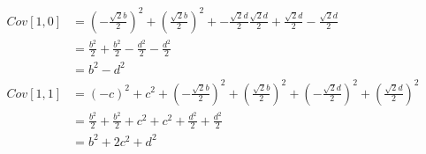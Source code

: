 \begin{align*}
    Cov[1,0] & = \left(- \frac{\sqrt{2} b}{2}\right)^{2} + \left(\frac{\sqrt{2} b}{2}\right)^{2} + - \frac{\sqrt{2} d}{2} \frac{\sqrt{2} d}{2} + \frac{\sqrt{2} d}{2} - \frac{\sqrt{2} d}{2}                      \\
             & = \frac{b^{2}}{2} + \frac{b^{2}}{2} - \frac{d^{2}}{2} - \frac{d^{2}}{2}                                                                                                                            \\
             & = b^{2} - d^{2}                                                                                                                                                                                    \\
    Cov[1,1] & = \left(- c\right)^{2} + c^{2} + \left(- \frac{\sqrt{2} b}{2}\right)^{2} + \left(\frac{\sqrt{2} b}{2}\right)^{2} + \left(- \frac{\sqrt{2} d}{2}\right)^{2} + \left(\frac{\sqrt{2} d}{2}\right)^{2} \\
             & = \frac{b^{2}}{2} + \frac{b^{2}}{2} + c^{2} + c^{2} + \frac{d^{2}}{2} + \frac{d^{2}}{2}                                                                                                            \\
             & = b^{2} + 2 c^{2} + d^{2}                                                                                                                                                                          \\
\end{align*}